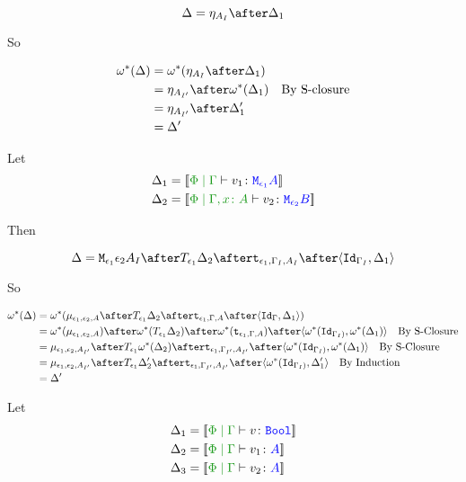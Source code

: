 \documentclass{report}
\begin{document}
\begin{equation}
    \D = \point{A_I}\after \D_1\\
\end{equation}

So

\begin{align*}
    \w\star(\D) &= \w\star(\point{A_I}\after \D_1)\\
            & = \point{A_{I'}} \after\w\star(\D_1)\qt{By S-closure}\\
            & = \point{A_{I'}} \after\D_1'\\
            & = \D'
\end{align*}

Let \begin{align*}
    \D_1 &= \deno{\gpetyperelation{v_1}{\M{\e_1}{A}}}\\
    \D_2 &= \deno{\etyperelation{\P}{\gax}{v_2}{\M{\e_2}{B}}}
\end{align*}

Then

\begin{equation}
    \D = \M{\e_1}{\e_2}{A_I}\after\T{\e_1}{\D_2}\after\tstrength{\e_1}{\G_I}{A_I}\after\pr{\Id{\G_{I}}}{\D_1}\\
\end{equation}

So

\begin{align*}
    \w\star(\D) &= \w\star(\bind{\e_1}{\e_2}{A}\after\T{\e_1}{\D_2}\after\tstrength{\e_1}{\G}{A}\after\pr{\Id{\G}}{\D_1})\\
    & = \w\star(\bind{\e_1}{\e_2}{A})\after\w\star(\T{\e_1}{\D_2})\after\w\star(\tstrength{\e_1}{\G}{A})\after\pr{\w\star(\Id{\G_{I})}}{\w\star(\D_1)}\qt{By S-Closure}\\
    &= \bind{\e_1}{\e_2}{A_{I'}}\after\T{\e_1}{\w\star(\D_2)}\after\tstrength{\e_1}{\G_{I'}}{A_{I'}}\after\pr{\w\star(\Id{\G_{I})}}{\w\star(\D_1)}\qt{By S-Closure}\\
    &= \bind{\e_1}{\e_2}{A_{I'}}\after\T{\e_1}{\D_2'}\after\tstrength{\e_1}{\G_{I'}}{A_{I'}}\after\pr{\w\star(\Id{\G_{I})}}{\D_1'}\qt{By Induction}\\
    &= \D'\\
\end{align*}


Let \begin{align*}
    \D_1 &= \deno{\gpetyperelation{v}{\B}}\\
    \D_2 &= \deno{\gpetyperelation{v_1}{A}}\\
    \D_3 &= \deno{\gpetyperelation{v_2}{A}}\\
\end{align*}
\end{document}
